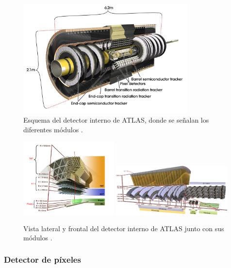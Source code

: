 \begin{figure}
\centering
  \includegraphics[width=0.8\textwidth]{images/lhc/pixel_2.jpg}
  \caption{Esquema del detector interno de ATLAS, donde se señalan los diferentes módulos \cite{Pequenao:1095926}.}
  \label{fig:pixel_1}
\end{figure}

\begin{figure}
  \centering
  \includegraphics[width=0.44\textwidth]{images/lhc/pixel_1.png}
  \includegraphics[width=0.54\textwidth]{images/lhc/pixel_4.png}
  \caption{Vista lateral y frontal del detector interno de ATLAS junto con sus módulos \cite{Pequenao:1095926,Kayl:1298112}.}
  \label{fig:pixel_23}
\end{figure}


\subsubsection{Detector de píxeles}

